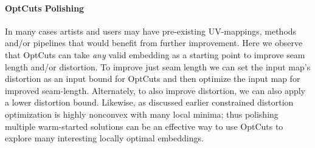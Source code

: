 \paragraph{OptCuts Polishing}

In many cases artists and users may have pre-existing UV-mappings, methods and/or pipelines that would benefit from further improvement. Here we observe that OptCuts can take \emph{any} valid embedding as a starting point to improve seam length and/or distortion. To improve just seam length we can set the input map's distortion as an input bound for OptCuts and then optimize the input map for improved seam-length. Alternately, to also improve distortion, we can also apply a lower distortion bound. Likewise, as discussed earlier constrained distortion optimization is highly nonconvex with many local minima; thus polishing multiple warm-started solutions can be an effective way to use OptCuts to explore many interesting locally optimal embeddings.


